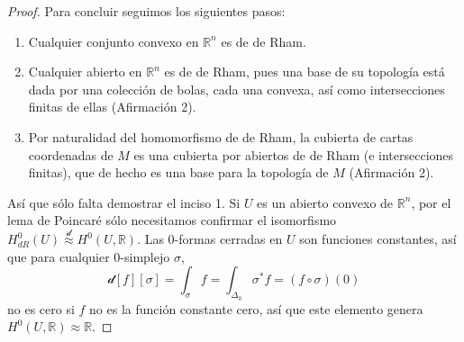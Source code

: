 \documentclass[spanish]{article}
\theoremstyle{definition}
\newcommand{\R}{\mathbb{R}}
\begin{document}
\begin{proof}
		Para concluir seguimos los siguientes pasos:
		\begin{enumerate}
			\item Cualquier conjunto convexo en $\R^n$ es de de Rham.
			\item Cualquier abierto en $\R^n$ es de de Rham, pues una base de su topología está dada por una colección de bolas, cada una convexa, así como intersecciones finitas de ellas (Afirmación 2).
			\item Por naturalidad del homomorfismo de de Rham, la cubierta de cartas coordenadas de $M$ es una cubierta por abiertos de de Rham (e intersecciones finitas), que de hecho es una base para la topología de $M$ (Afirmación 2).
		\end{enumerate}
		Así que sólo falta demostrar el inciso 1. Si $U$ es un abierto convexo de $\R^n$, por el lema de Poincaré sólo necesitamos confirmar el isomorfismo $H^0_{dR}(U)\overset{\mathcal{d}}{\approx}H^0(U,\R)$. Las 0-formas cerradas en $U$ son funciones constantes, así que para cualquier 0-simplejo $\sigma$,
		\[\mathcal{d}[f][\sigma]=\int_{\sigma}f=\int_{\Delta_0}\sigma^*f=(f\circ\sigma)(0)\]
		no es cero si $f$ no es la función constante cero, así que este elemento genera $H^0(U,\R)\approx\R$.
		

	
		\iffalse 
		\begin{enumerate}
			\item La unión disjunta de variedades de de Rham es de de Rham.
			
			\item Cualquier convexo en $\R^n$ es de de Rham.
			
			\item Si $M$ tiene una cubierta finita de de Rham, $M$ es de de Rham.
			
			\item Si la topología de $M$ tiene una base por abiertos de de Rham, $M$ es de de Rham.
			
			\item Cualquier abierto en $\R^n$ es de de Rham.
			
			\item Cualquier variedad suave es de de Rham.
			
			
			
	\end{enumerate}\fi
		

\end{proof}
\end{document}
